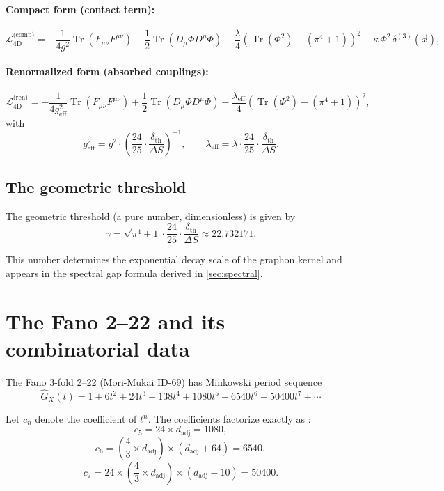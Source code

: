 \documentclass[12pt]{article}
\numberwithin{equation}{section}
\newcommand{\dth}{\delta_{\mathrm{th}}}
\newcommand{\DS}{\Delta S}
\newcommand{\cL}{\mathcal{L}}
\begin{document}
\paragraph{Compact form (contact term):}
\[
\boxed{
\cL_{\text{4D}}^{\text{(comp)}} = -\frac{1}{4g^2} \operatorname{Tr}(F_{\mu\nu}F^{\mu\nu}) + \frac{1}{2} \operatorname{Tr}(D_\mu\Phi D^\mu\Phi) - \frac{\lambda}{4} \left( \operatorname{Tr}(\Phi^2) - (\pi^4+1) \right)^2 + \kappa\, \Phi^2\, \delta^{(3)}(\vec{x}),
}
\]

\paragraph{Renormalized form (absorbed couplings):}
\[
\boxed{
\cL_{\text{4D}}^{\text{(ren)}} = -\frac{1}{4g_{\text{eff}}^2} \operatorname{Tr}(F_{\mu\nu}F^{\mu\nu}) + \frac{1}{2} \operatorname{Tr}(D_\mu\Phi D^\mu\Phi) - \frac{\lambda_{\text{eff}}}{4} \left( \operatorname{Tr}(\Phi^2) - (\pi^4+1) \right)^2,
}
\]
with
\[
g_{\text{eff}}^2 = g^2 \cdot \left( \frac{24}{25} \cdot \frac{\dth}{\DS} \right)^{-1}, \qquad
\lambda_{\text{eff}} = \lambda \cdot \frac{24}{25} \cdot \frac{\dth}{\DS}. \tag{11}
\]

\subsection{The geometric threshold}

The geometric threshold (a pure number, dimensionless) is given by
\[
\gamma = \sqrt{\pi^4+1} \cdot \frac{24}{25} \cdot \frac{\dth}{\DS} \approx 22.732171. \tag{12}
\]

This number determines the exponential decay scale of the graphon kernel and appears in the spectral gap formula derived in \cref{sec:spectral}.

\section{The Fano 2--22 and its combinatorial data}

The Fano 3-fold 2--22 (Mori-Mukai ID-69) has Minkowski period sequence \cite{coates2013}
\[
\widehat{G}_X(t) = 1 + 6t^2 + 24t^3 + 138t^4 + 1080t^5 + 6540t^6 + 50400t^7 + \cdots \tag{13}
\]

Let \(c_n\) denote the coefficient of \(t^n\). The coefficients factorize exactly as \cite{blandino2026fano}:
\[
c_5 = 24 \times d_{\text{adj}} = 1080, \tag{14}
\]
\[
c_6 = \left(\frac{4}{3} \times d_{\text{adj}}\right) \times (d_{\text{adj}} + 64) = 6540, \tag{15}
\]
\[
c_7 = 24 \times \left(\frac{4}{3} \times d_{\text{adj}}\right) \times (d_{\text{adj}} - 10) = 50400. \tag{16}
\]
\end{document}
